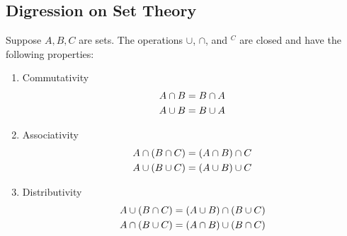 \subsection{Digression on Set Theory}
Suppose $A, B, C$ are sets. The operations $\cup$, $\cap$, and $^C$ are closed and have the following properties:
\begin{enumerate}
    \item Commutativity
    \begin{align}
        A \cap B &= B \cap A\\
        A \cup B &= B \cup A \notag
    \end{align}
    \item Associativity
    \begin{align}
        A \cap (B\cap C) &= (A \cap B) \cap C\\
        A \cup (B\cup C) &= (A \cup B) \cup C \notag
    \end{align}
    \item Distributivity
    \begin{align}
        A \cup (B \cap C) &= (A \cup B) \cap (B \cup C)\\
        A \cap (B \cup C) &= (A \cap B) \cup (B \cap C) \notag
    \end{align}
\end{enumerate}

